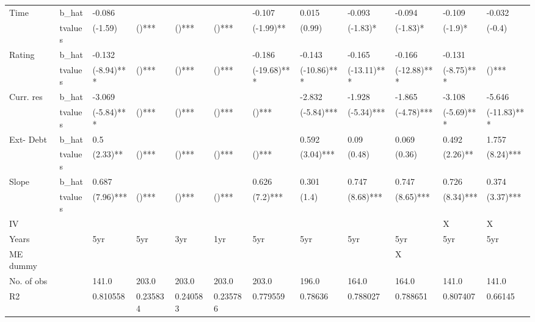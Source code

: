 \begin{tabular}{llllllllllll}
Time & b\_hat &    -0.086 &        &        &        &    -0.107 &    0.015 &    -0.093 &    -0.094 &    -0.109 &   -0.032 \\

   & tvalues & (-1.59) & ()*** & ()*** & ()*** & (-1.99)** & (0.99) & (-1.83)* & (-1.83)* & (-1.9)* & (-0.4)\\ 


Rating & b\_hat &    -0.132 &        &        &        &    -0.186 &   -0.143 &    -0.165 &    -0.166 &    -0.131 &       \\

   & tvalues & (-8.94)*** & ()*** & ()*** & ()*** & (-19.68)*** & (-10.86)*** & (-13.11)*** & (-12.88)*** & (-8.75)*** & ()***\\ 


Curr. res & b\_hat &    -3.069 &        &        &        &        &   -2.832 &    -1.928 &    -1.865 &    -3.108 &   -5.646 \\

   & tvalues & (-5.84)*** & ()*** & ()*** & ()*** & ()*** & (-5.84)*** & (-5.34)*** & (-4.78)*** & (-5.69)*** & (-11.83)***\\ 


Ext- Debt & b\_hat &       0.5 &        &        &        &        &    0.592 &      0.09 &     0.069 &     0.492 &    1.757 \\

   & tvalues & (2.33)** & ()*** & ()*** & ()*** & ()*** & (3.04)*** & (0.48) & (0.36) & (2.26)** & (8.24)***\\ 


Slope & b\_hat &     0.687 &        &        &        &     0.626 &    0.301 &     0.747 &     0.747 &     0.726 &    0.374 \\

   & tvalues & (7.96)*** & ()*** & ()*** & ()*** & (7.2)*** & (1.4) & (8.68)*** & (8.65)*** & (8.34)*** & (3.37)***\\ 


IV &         &        &        &        &        &        &       &        &        &         X &        X \\
Years &         &       5yr &       5yr &       3yr &       1yr &       5yr &      5yr &       5yr &       5yr &       5yr &      5yr \\
ME dummy &         &        &        &        &        &        &       &        &         X &        &       \\
No. of obs &         &     141.0 &     203.0 &     203.0 &     203.0 &     203.0 &    196.0 &     164.0 &     164.0 &     141.0 &    141.0 \\
R2 &         &  0.810558 &  0.235834 &  0.240583 &  0.235786 &  0.779559 &  0.78636 &  0.788027 &  0.788651 &  0.807407 &  0.66145 \\
\bottomrule
\end{tabular}
